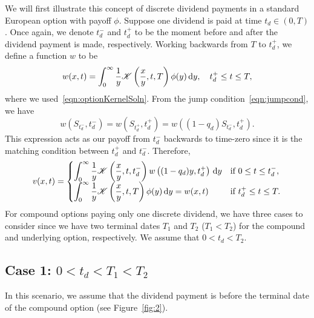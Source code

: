 We will first illustrate this concept of discrete dividend payments in a standard European option with payoff $\phi$. Suppose one dividend is paid at time $t_d \in (0,T)$. Once again, we denote $t_d^-$ and $t_d^+$ to be the moment before and after the dividend payment is made, respectively. Working backwards from $T$ to $t_d^+$, we define a function $w$ to be
		$$
			w(x,t) = \int_0^\infty \frac{1}{y} \mathscr K\left( \frac{x}{y},t, T \right)\phi(y) \, \mathrm d y, \quad t_d^+ \leq t \leq T,
		$$
where we used~\eqref{eqn:optionKernelSoln}. From the jump condition~\eqref{eqn:jumpcond}, we have
		$$
			w\left(S_{t_d^-},t_d^-\right) = w\left(S_{t_d^+},t_d^+\right) = w\left((1-q_d)S_{t_d^-},t_d^+\right).
		$$
This expression acts as our payoff from $t_d^-$ backwards to time-zero since it is the matching condition between $t_d^+$ and $t_d^-$. Therefore,
		\begin{equation}
			\label{eqn:cool}
			v(x,t) =
			\begin{cases}
				\displaystyle\int_0^\infty \frac{1}{y} \mathscr K\left( \frac{x}{y}, t, t_d^- \right)w\left( (1-q_d)y, t_d^+ \right) \, \mathrm d y & \text{if } 0 \leq t \leq t_d^-, \\
				\displaystyle\int_0^\infty \frac{1}{y} \mathscr K\left( \frac{x}{y}, t, T \right) \phi(y) \, \mathrm d y = w(x,t) & \text{if } t_d^+ \leq t \leq T.
			\end{cases}
		\end{equation}
For compound options paying only one discrete dividend, we have three cases to consider since we have two terminal dates $T_1$ and $T_2$ ($T_1 < T_2$) for the compound and underlying option, respectively. We assume that $0 < t_d < T_2$.

\subsection{Case 1: $0 < t_d < T_1 < T_2$}
In this scenario, we assume that the dividend payment is before the terminal date of the compound option (see Figure~\ref{fig:2}).

